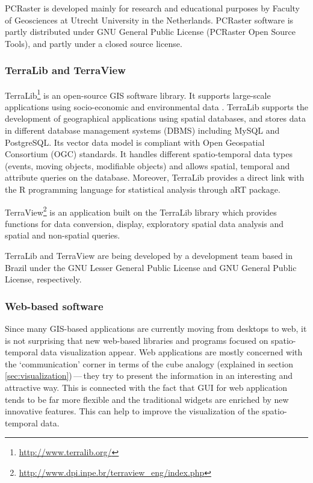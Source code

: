 \documentclass[a4paper,12pt,oneside]{book}
\newcommand{\dash}{\mbox{\,---\,}}
\begin{document}
PCRaster is developed mainly for research and educational purposes by
Faculty of Geosciences at Utrecht University in the Netherlands.
PCRaster software is partly distributed under GNU General Public License (PCRaster Open Source Tools),
and partly under a closed source license.

\subsubsection{TerraLib and TerraView}
TerraLib\footnote{\url{http://www.terralib.org/}} is an open-source GIS software library.
It supports large-scale applications using socio-economic
and environmental data \cite{camara2008terralib}.
TerraLib supports the development of geographical applications
using spatial databases, and stores data in different database management systems (DBMS)
including MySQL and PostgreSQL. Its vector data model is compliant with Open Geospatial
Consortium (OGC) standards. It handles different spatio-temporal data types (events,
moving objects, modifiable objects) and allows spatial, temporal and
attribute queries on the database. Moreover, TerraLib provides a  direct link with the
R programming language for statistical analysis through aRT package.

TerraView\footnote{\url{http://www.dpi.inpe.br/terraview_eng/index.php}}
is an application built on the TerraLib library
which provides functions for data conversion, display, exploratory spatial data
analysis and spatial and non-spatial queries.

TerraLib and TerraView are being developed by a development team based in Brazil
under the GNU Lesser General Public License and GNU General Public License, respectively.


\subsubsection{Web-based software}
Since many GIS-based applications are currently moving from desktops to web, it is not surprising that
new web-based libraries and programs focused on  spatio-temporal data visualization appear.
Web applications are mostly concerned with the `communication' corner in terms of the cube analogy
(explained in section \ref{sec:visualization})\dash they try to present the information
in an interesting and attractive way. This is connected with the fact that GUI for web application
tends to be  far more flexible and the traditional widgets are enriched by new innovative features.
This can help to improve the visualization of the spatio-temporal data.
\end{document}
